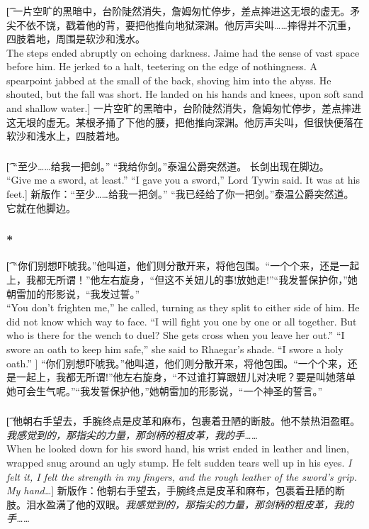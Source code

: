 \documentclass[12pt,a4paper]{article}
\begin{document}
\subsubsection{}\t[
	一片空旷的黑暗中，台阶陡然消失，詹姆匆忙停步，差点摔进这无垠的虚无。矛尖不依不饶，戳着他的背，要把他推向地狱深渊。他厉声尖叫……摔得并不沉重，四肢着地，周围是软沙和浅水。\\	
	The steps ended abruptly on echoing darkness. Jaime had the sense of vast space before him. He jerked to a halt, teetering on the edge of nothingness. A spearpoint jabbed at the small of the back, shoving him into the abyss. He shouted, but the fall was short. He landed on his hands and knees, upon soft sand and shallow water.]
	一片空旷的黑暗中，台阶陡然消失，詹姆匆忙停步，差点摔进这无垠的虚无。某根矛捅了下他的腰，把他推向深渊。他厉声尖叫，但很快便落在软沙和浅水上，四肢着地。
	
\subsubsection{}\t[	
	“至少……给我一把剑。”
	“我给你剑。”泰温公爵突然道。
	长剑出现在脚边。\\
	“Give me a sword, at least.”
	“I gave you a sword,” Lord Tywin said.
	It was at his feet.]
	新版作：“至少……给我一把剑。”
	“我已经给了你一把剑。”泰温公爵突然道。
	它就在他脚边。
	
\subsubsection{\color{red}*}\t[
“你们别想吓唬我。”他叫道，他们则分散开来，将他包围。“一个个来，还是一起上，我都无所谓！”他左右旋身，“但这不关妞儿的事!放她走!”“我发誓保护你，”她朝雷加的形影说，“我发过誓。”\\
“You don't frighten me,” he called, turning as they split to either side of him. He did not know which way to face. “I will fight you one by one or all together. But who is there for the wench to duel? She gets cross when you leave her out.” “I swore an oath to keep him safe,” she said to Rhaegar's shade. “I swore a holy oath.” ]
“你们别想吓唬我。”他叫道，他们则分散开来，将他包围。“一个个来，还是一起上，我都无所谓!”他左右旋身，“不过谁打算跟妞儿对决呢？要是叫她落单她可会生气呢。”“我发誓保护他，”她朝雷加的形影说，“一个神圣的誓言。”

\subsubsection{}\t[
	他朝右手望去，手腕终点是皮革和麻布，包裹着丑陋的断肢。他不禁热泪盈眶。\emph{我感觉到的，那指尖的力量，那剑柄的粗皮革，我的手……}\\
	When he looked down for his sword hand, his wrist ended in leather and linen, wrapped snug around an ugly stump. He felt sudden tears well up in his eyes. \emph{I felt it, I felt the strength in my fingers, and the rough leather of the sword's grip. My hand\ldots}]
	新版作：他朝右手望去，手腕终点是皮革和麻布，包裹着丑陋的断肢。泪水盈满了他的双眼。\emph{我感觉到的，那指尖的力量，那剑柄的粗皮革，我的手……}
	
\end{document}
